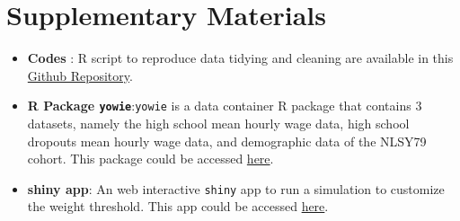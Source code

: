 \hypertarget{supplementary-materials}{%
\section{Supplementary Materials}\label{supplementary-materials}}

\begin{itemize}
\item
  \textbf{Codes} : R script to reproduce data tidying and cleaning are
  available in this
  \href{https://github.com/numbats/yowie/blob/master/data-raw/data_preprocessing.R}{Github
  Repository}.
\item
  \textbf{R Package \texttt{yowie}}:\texttt{yowie} is a data container R
  package that contains 3 datasets, namely the high school mean hourly
  wage data, high school dropouts mean hourly wage data, and demographic
  data of the NLSY79 cohort. This package could be accessed
  \href{https://github.com/numbats/yowie}{here}.
\item
  \textbf{shiny app}: An web interactive \texttt{shiny} app to run a
  simulation to customize the weight threshold. This app could be
  accessed
  \href{https://github.com/numbats/summer-wages-refresh/tree/main/app}{here}.
\end{itemize}



